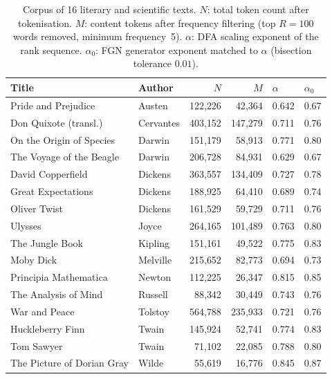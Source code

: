 \documentclass[12pt,a4paper]{article}
\begin{document}
\begin{table}[t]
\centering
\caption{Corpus of 16 literary and scientific texts.
$N$: total token count after tokenisation.
$M$: content tokens after frequency filtering
(top $R=100$ words removed, minimum frequency~5).
$\alpha$: DFA scaling exponent of the rank sequence.
$\alpha_0$: FGN generator exponent matched to $\alpha$ (bisection
tolerance $0.01$).}
\label{tab:corpus}
\small
\begin{tabular}{llrrll}
\toprule
Title & Author & $N$ & $M$ & $\alpha$ & $\alpha_0$ \\
\midrule
Pride and Prejudice        & Austen    & 122{,}226 &  42{,}364 & 0.642 & 0.67 \\
Don Quixote (transl.)      & Cervantes & 403{,}152 & 147{,}279 & 0.711 & 0.76 \\
On the Origin of Species   & Darwin    & 151{,}179 &  58{,}913 & 0.771 & 0.80 \\
The Voyage of the Beagle   & Darwin    & 206{,}728 &  84{,}931 & 0.629 & 0.67 \\
David Copperfield          & Dickens   & 363{,}557 & 134{,}409 & 0.727 & 0.78 \\
Great Expectations         & Dickens   & 188{,}925 &  64{,}410 & 0.689 & 0.74 \\
Oliver Twist               & Dickens   & 161{,}529 &  59{,}729 & 0.711 & 0.76 \\
Ulysses                    & Joyce     & 264{,}165 & 101{,}489 & 0.763 & 0.80 \\
The Jungle Book            & Kipling   & 151{,}161 &  49{,}522 & 0.775 & 0.83 \\
Moby Dick                  & Melville  & 215{,}652 &  82{,}773 & 0.694 & 0.73 \\
Principia Mathematica      & Newton    & 112{,}225 &  26{,}347 & 0.815 & 0.85 \\
The Analysis of Mind       & Russell   &  88{,}342 &  30{,}449 & 0.743 & 0.76 \\
War and Peace              & Tolstoy   & 564{,}788 & 235{,}933 & 0.721 & 0.76 \\
Huckleberry Finn           & Twain     & 145{,}924 &  52{,}741 & 0.774 & 0.83 \\
Tom Sawyer                 & Twain     &  71{,}102 &  22{,}085 & 0.788 & 0.80 \\
The Picture of Dorian Gray & Wilde     &  55{,}619 &  16{,}776 & 0.845 & 0.87 \\
\bottomrule
\end{tabular}
\end{table}
\end{document}
